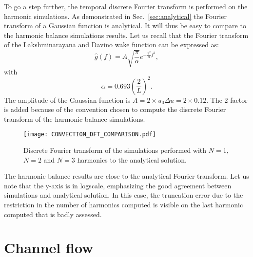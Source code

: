 To go a step further, the temporal discrete Fourier transform is performed
on the harmonic simulations. As demonstrated in Sec.~\ref{sec:analytical}
the Fourier transform of a Gaussian function is analytical. It will thus 
be easy to compare to the harmonic balance simulations results.
Let us recall that the Fourier transform of the Lakshminarayana and Davino
wake function can be expressed as:
\begin{equation}
    \widehat{g}(f) = A \sqrt{\frac{\pi}{\alpha}} e^{-\frac{\pi^2}{\alpha} f^2},
\end{equation}
with
\begin{equation}
    \alpha =  0.693 \left( \frac{2}{L} \right)^2.
\end{equation}
The amplitude of the Gaussian function is $A=2 \times u_0 \Delta u = 2 \times 0.12$.
The $2$ factor is added because of the convention chosen
to compute the discrete Fourier transform of the harmonic balance simulations.
\begin{figure}[htbp]
  \begin{center}
    \texttt{[image: CONVECTION\_DFT\_COMPARISON.pdf]}
  \end{center}
  \caption{Discrete Fourier transform of the simulations performed with $N=1$, 
  $N=2$ and $N=3$ harmonics to the analytical solution.}
  \label{fig:convection_dft_comparison}
\end{figure}
The harmonic balance results are close to the analytical Fourier transform.
Let us note that the y-axis is in logscale, emphasizing the good
agreement between simulations and analytical solution.
In this case, the truncation error due to the restriction in the 
number of harmonics computed is visible on the last harmonic computed
that is badly assessed.




\section{Channel flow}
\label{sec:channel-flow}

